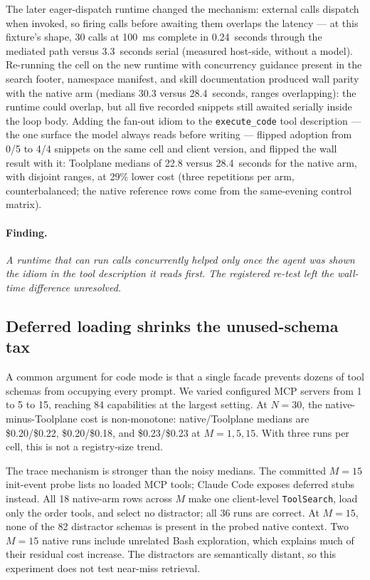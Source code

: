 \documentclass[10pt,twocolumn]{article}
\newcommand{\usd}[1]{\$#1}
\newcommand{\finding}[1]{\paragraph{Finding.} \emph{#1}}
\begin{document}
The later eager-dispatch runtime changed the mechanism: external calls
dispatch when invoked, so firing calls before awaiting them overlaps the
latency --- at this fixture's shape, 30 calls at 100~ms complete in
0.24~seconds through the mediated path versus 3.3~seconds serial (measured
host-side, without a model).  Re-running the cell on the new runtime with
concurrency guidance present in the search footer, namespace manifest, and
skill documentation produced wall parity with the native arm (medians 30.3
versus 28.4~seconds, ranges overlapping): the runtime could overlap, but all
five recorded snippets still awaited serially inside the loop body.  Adding
the fan-out idiom to the \texttt{execute\_code} tool description --- the one
surface the model always reads before writing --- flipped adoption from 0/5
to 4/4 snippets on the same cell and client version, and flipped the wall
result with it: Toolplane medians of 22.8 versus 28.4~seconds for the native
arm, with disjoint ranges, at 29\% lower cost (three repetitions per arm,
counterbalanced; the native reference rows come from the same-evening control
matrix).

\finding{A runtime that can run calls concurrently helped only once the agent was
shown the idiom in the tool description it reads first.  The registered
re-test left the wall-time difference unresolved.}



\subsection{Deferred loading shrinks the unused-schema tax}

A common argument for code mode is that a single facade prevents dozens of
tool schemas from occupying every prompt.  We varied configured MCP servers
from 1 to 5 to 15, reaching 84 capabilities at the largest setting.  At
$N=30$, the native-minus-Toolplane cost is non-monotone: native/Toolplane medians are
\usd{0.20}/\usd{0.22}, \usd{0.20}/\usd{0.18}, and
\usd{0.23}/\usd{0.23} at $M=1,5,15$.  With three runs per cell, this is not a
registry-size trend.

The trace mechanism is stronger than the noisy medians.  The committed $M=15$
init-event probe lists no loaded MCP tools; Claude Code exposes deferred stubs
instead.  All 18 native-arm rows across $M$ make one client-level
\texttt{ToolSearch}, load only the order tools, and select no distractor; all
36 runs are correct.  At $M=15$, none of the 82 distractor schemas is present
in the probed native context.  Two $M=15$ native runs include unrelated Bash
exploration, which explains much of their residual cost increase.  The
distractors are semantically distant, so this experiment does not test
near-miss retrieval.
\end{document}
